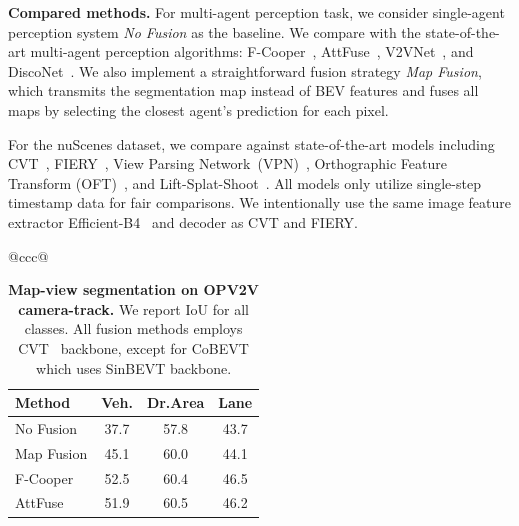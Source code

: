 \documentclass{article}
\begin{document}
{\noindent\textbf{Compared methods.} For multi-agent perception task, we consider single-agent perception system \textit{No Fusion} as the baseline.
We compare with the state-of-the-art multi-agent perception algorithms: F-Cooper~\cite{chen2019f}, AttFuse~\cite{xu2021opv2v}, V2VNet~\cite{wang2020v2vnet}, and DiscoNet~\cite{li2021learning}.  We also implement a straightforward fusion strategy \textit{Map Fusion}, which transmits the segmentation map instead of BEV features and fuses all maps by selecting the closest agent's prediction for each pixel.
%
%
%

%
For the nuScenes dataset, we compare against state-of-the-art models including CVT~\cite{zhou2022cross}, FIERY~\cite{hu2021fiery}, View Parsing Network~(VPN)~\cite{pan2020cross}, Orthographic Feature Transform (OFT)~\cite{roddick2018orthographic}, and Lift-Splat-Shoot~\cite{philion2020lift}.
%
All models only utilize single-step timestamp data for fair comparisons.
%
We intentionally use the same image feature extractor Efficient-B4~\cite{tan2019efficientnet} and decoder as CVT and FIERY.


\begin{table}[!t]
\centering
\footnotesize
\setlength{\tabcolsep}{4pt}
\begin{tabular}{@{}ccc@{}}

\begin{minipage}[t]{0.34\textwidth}
\centering
\footnotesize
\setlength{\tabcolsep}{2pt}
\caption{\textbf{Map-view segmentation on OPV2V camera-track.} We report IoU for all classes. All fusion methods employs CVT~\cite{zhou2022cross} backbone, except for CoBEVT which uses SinBEVT backbone.}
\label{tab:opv2vcamera}
\begin{tabular}{l|ccc}
\cellcolor{lightgray} Method & \cellcolor{lightgray}Veh. & \cellcolor{lightgray}Dr.Area & \cellcolor{lightgray}Lane\\
\toprule
No Fusion & 37.7 &57.8 & 43.7 \\\hline
 Map Fusion & 45.1 & 60.0 & 44.1 \\
 F-Cooper~\cite{chen2019f} & 52.5 & 60.4 & 46.5 \\
 AttFuse~\cite{xu2021opv2v} & 51.9 & 60.5 & 46.2 \\
  

\end{tabular}
\end{minipage}
\end{tabular}
\end{table}}
\end{document}
